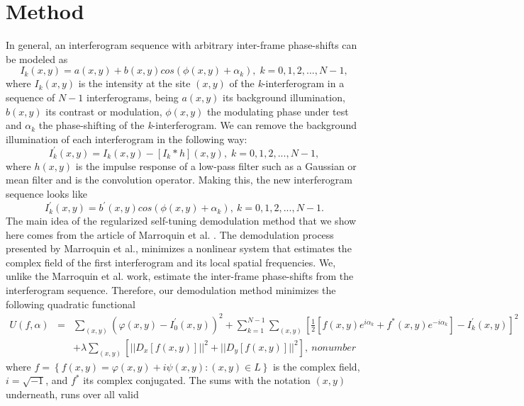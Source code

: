 \section{Method }

In general, an interferogram sequence with arbitrary inter-frame phase-shifts
can be modeled as 
\begin{equation}
I_{k}(x,y)=a(x,y)+b(x,y)cos(\phi(x,y)+\alpha_{k}),\; k=0,1,2,...,N-1,\label{eq:
Ik}
\end{equation}
 where $I_{k}(x,y)$ is the intensity at the site $(x,y)$ of the
\emph{k}-interferogram in a sequence of $N-1$ interferograms, being
$a(x,y)$ its background illumination, $b(x,y)$ its contrast or modulation,
$\phi(x,y)$ the modulating phase under test and $\alpha_{k}$ the
phase-shifting of the \emph{k}-interferogram. We can remove the background
illumination of each interferogram in the following way: 
\begin{equation}
I_{k}^{'}(x,y)=I_{k}(x,y)-[I_{k}*h](x,y),\; k=0,1,2,...,N-1,\label{eq:I'}
\end{equation}
where $h(x,y)$ is the impulse response of a low-pass filter such
as a Gaussian or mean filter and \textasteriskcentered{} is the convolution
operator\cite{Jahne}. Making this, the new interferogram sequence looks
like 
\begin{equation}
I_{k}^{'}(x,y)=b^{'}(x,y)cos(\phi(x,y)+\alpha_{k}),\: k=0,1,2,...,N-1.\label{eq:
I'2}
\end{equation}
The main idea of the regularized self-tuning demodulation method that
we show here comes from the article of Marroquin et al. \cite{RQF}.
The demodulation process presented by Marroquin et al., minimizes
a nonlinear system that estimates the complex field of the first interferogram
and its local spatial frequencies. We, unlike the Marroquin et al.
work, estimate the inter-frame phase-shifts from the interferogram
sequence. Therefore, our demodulation method minimizes the following
quadratic functional
\begin{eqnarray}
U(f,\alpha) & = & \sum_{(x,y)}(\varphi(x,y)-I_{0}^{'}(x,y))^{2}+\sum_{k=1}^{N-1}
\sum_{(x,y)}[\frac{1}{2}[f(x,y)e^{i\alpha_{k}}+f^{*}(x,y)e^{-i\alpha_{k}}]-I_{k}
^{'}(x,y)]^{2}\label{eq:U}\\
 &  & +\lambda\sum_{(x,y)}[||D_{x}[f(x,y)]||^{2}+||D_{y}[f(x,y)]||^{2}],\
nonumber 
\end{eqnarray}
where $f=\left\{ f(x,y)=\varphi(x,y)+i\psi(x,y):(x,y)\in L\right\} $
is the complex field, $i=\sqrt{-1}$, and $f^{*}$ its complex conjugated.
The sums with the notation $(x,y)$ underneath, runs over all valid
